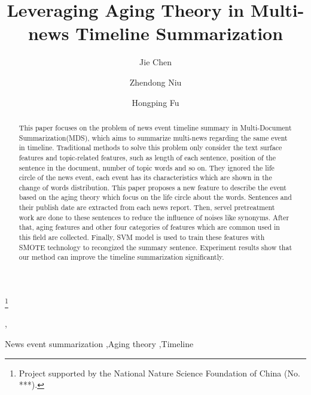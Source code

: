 \documentclass[print]{jicspack}
\begin{document}
\begin{premaker}


\title{Leveraging  Aging Theory in Multi-news Timeline Summarization}
\thanks[label1]{Project supported by the National Nature Science Foundation of China (No. ***).}
\author[author1]{Jie Chen},
\author[author2]{Zhendong Niu}
\author[author3]{Hongping Fu}
\address[author1]{School of Computer Science, Beijing Institute of Technology, Beijing 100081, China}
\address[author2]{School of Computer Science, Beijing Institute of Technology, Beijing 100081, China}
\address[author3]{School of Computer Science, Beijing Institute of Technology, Beijing 100081, China}

\begin{abstract}
This paper focuses on the problem of news event timeline summary in Multi-Document Summarization(MDS), which aims to summarize multi-news regarding the same event in timeline.
Traditional methods to solve this problem only consider the text surface features and topic-related features, such as length of each sentence, position of the sentence in the document, number of topic words and so on.
They ignored the life circle of the news event, each event has its characteristics which are shown in the change of words distribution.
This paper proposes a new feature to describe the event based on the aging theory which focus on the life circle about the words.
Sentences and their publish date are extracted from each news report.
Then, servel pretreatment work are done to these sentences to reduce the influence of noises like synonyms.
After that, aging features and other four categories of features which are common used in this field are collected.
Finally, SVM model is used to train these features with SMOTE technology to recongized the summary sentence.
Experiment results show that our method can improve the timeline summarization significantly.

\end{abstract}
\begin{keyword}
News event summarization \sep Aging theory \sep Timeline
\end{keyword}
\end{premaker}
\end{document}
